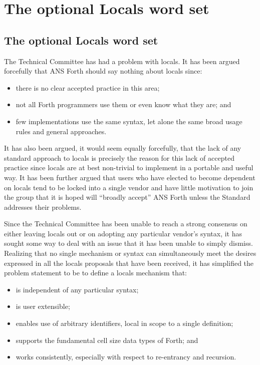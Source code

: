 \chapter{The optional Locals word set} %

\begin{intro}
\section{The optional Locals word set} %
\label{rat:locals}

The Technical Committee has had a problem with locals. It has been
argued forcefully that ANS Forth should say nothing about locals
since:

\begin{itemize}
\item there is no clear accepted practice in this area;
\item not all Forth programmers use them or even know what they are;
and
\item few implementations use the same syntax, let alone the same
	broad usage rules and general approaches.
\end{itemize}

It has also been argued, it would seem equally forcefully, that the
lack of any standard approach to locals is precisely the reason for
this lack of accepted practice since locals are at best non-trivial
to implement in a portable and useful way. It has been further argued
that users who have elected to become dependent on locals tend to be
locked into a single vendor and have little motivation to join the
group that it is hoped will ``broadly accept'' ANS Forth unless the
Standard addresses their problems.

Since the Technical Committee has been unable to reach a strong
consensus on either leaving locals out or on adopting any particular
vendor's syntax, it has sought some way to deal with an issue that it
has been unable to simply dismiss. Realizing that no single mechanism
or syntax can simultaneously meet the desires expressed in all the
locals proposals that have been received, it has simplified the
problem statement to be to define a locals mechanism that:

\begin{itemize}
\item is independent of any particular syntax;
\item is user extensible;
\item enables use of arbitrary identifiers,
	local in scope to a single definition;
\item supports the fundamental cell size data types of Forth;
and
\item works consistently, especially with respect to
	re-entrancy and recursion.
\end{itemize}


\end{intro}
